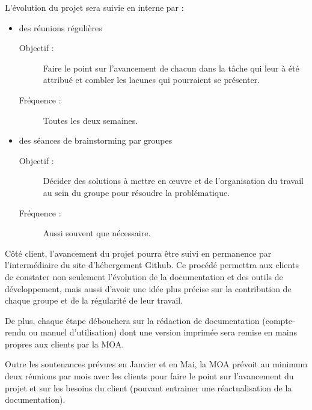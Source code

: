 \documentclass{../../res/univ-projet}
\begin{document}
	L'évolution du projet sera suivie en interne par : 
	\begin{itemize}
		\item des réunions régulières 
		\begin{description}
			\item[Objectif :] Faire le point sur l'avancement de chacun dans la tâche qui leur à été attribué et combler les lacunes qui pourraient se présenter.
			\item[Fréquence :] Toutes les deux semaines.
		\end{description}
		\item des séances de brainstorming par groupes
		\begin{description}
			\item[Objectif :] Décider des solutions à mettre en œuvre et de l'organisation du travail au sein du groupe pour résoudre la problématique.
			\item[Fréquence :] Aussi souvent que nécessaire.
		\end{description}
	\end{itemize}

	Côté client, l'avancement du projet pourra être suivi en permanence par l'intermédiaire du site d'hébergement Github. Ce procédé permettra aux clients de constater non seulement l'évolution de la documentation et des outils de développement, mais aussi d'avoir une idée plus précise sur la contribution de chaque groupe et de la régularité de leur travail.

	De plus, chaque étape débouchera sur la rédaction de documentation (compte-rendu ou manuel d'utilisation) dont une version imprimée sera remise en mains propres aux clients par la MOA.


	Outre les soutenances prévues en Janvier et en Mai, la MOA prévoit au minimum deux réunions par mois avec les clients pour faire le point sur l'avancement du projet et sur les besoins du client (pouvant entrainer une réactualisation de la documentation).
\end{document}

